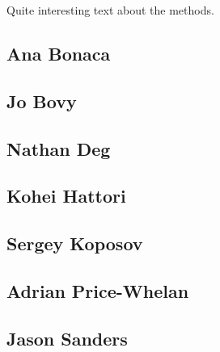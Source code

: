 Quite interesting text about the methods.

\subsection{Ana Bonaca}


\subsection{Jo Bovy}


\subsection{Nathan Deg}


\subsection{Kohei Hattori}


\subsection{Sergey Koposov}


\subsection{Adrian Price-Whelan}


\subsection{Jason Sanders}
